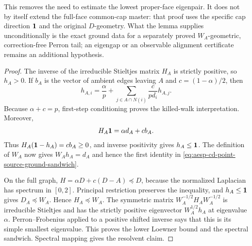 \begin{lemma}
This removes the need to estimate the lowest proper-face eigenpair.  It does
not by itself extend the full-face common-cap master: that proof uses the
specific cap direction \(\mathbf{1}\) and the original \(D\)-geometry.  What the
lemma supplies unconditionally is the exact ground data for a separately
proved \(W_A\)-geometric, correction-free Perron tail; an eigengap or an
observable alignment certificate remains an additional hypothesis.
\end{lemma}

\begin{proof}
The inverse of the irreducible Stieltjes matrix \(H_A\) is strictly positive,
so \(h_A>0\).  If \(b_A\) is the vector of ambient edges leaving \(A\) and
\(c=(1-\alpha)/2\), then
\begin{equation*}
 h_{A,i}
 =\frac{\alpha}{p}
  +\sum_{j\in A\cap N(i)}\frac{c}{pd_i}h_{A,j}.
\end{equation*}
Because \(\alpha+c=p\), first-step conditioning proves the killed-walk
interpretation.  Moreover,
\begin{equation*}
 H_A\mathbf{1}=\alpha d_A+c b_A.
\end{equation*}
Thus \(H_A(\mathbf{1}-h_A)=cb_A\geq0\), and inverse positivity gives
\(h_A\leq\mathbf{1}\).  The definition of \(W_A\) now gives
\(W_Ah_A=d_A\) and hence the first identity in
\cref{eq:aesp-cd-point-source-ground-sandwich}.

On the full graph,
\(H=\alpha D+c(D-A)\preceq D\), because the normalized Laplacian has
spectrum in \([0,2]\).  Principal restriction preserves the inequality, and
\(h_A\leq\mathbf{1}\) gives \(D_A\preceq W_A\).  Hence \(H_A\preceq W_A\).
The symmetric matrix \(W_A^{-1/2}H_AW_A^{-1/2}\) is irreducible Stieltjes
and has the strictly positive eigenvector \(W_A^{1/2}h_A\) at eigenvalue
\(\alpha\).  Perron--Frobenius applied to a positive shifted inverse says
that this is its simple smallest eigenvalue.  This proves the lower Loewner
bound and the spectral sandwich.  Spectral mapping gives the resolvent
claim.
\end{proof}

